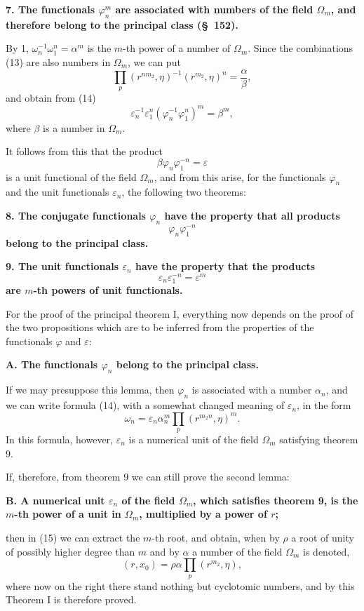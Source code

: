 \documentclass[11pt]{article}
\providecommand{\eps}{\varepsilon}
\providecommand{\eps}{\varepsilon}
\begin{document}
\textbf{7. The functionals $\varphi_n^m$ are associated with numbers of the field $\Omega_m$, and therefore belong to the principal class (\S~152).}

By 1, $\omega_n^{-1}\omega_1^n=\alpha^m$ is the $m$-th power of a number of $\Omega_m$. Since the combinations (13) are also numbers in $\Omega_m$, we can put
\[
  \prod_p (r^{n m_2},\eta)^{-1}(r^{m_2},\eta)^n=\frac{\alpha}{\beta},
\]
and obtain from (14)
\[
  \eps_n^{-1}\eps_1^n(\varphi_n^{-1}\varphi_1^n)^m=\beta^m,
\]
where $\beta$ is a number in $\Omega_m$.

It follows from this that the product
\[
  \beta\varphi_n\varphi_1^{-n}=\eps
\]
is a unit functional of the field $\Omega_m$, and from this arise, for the functionals $\varphi_n$ and the unit functionals $\eps_n$, the following two theorems:

\textbf{8. The conjugate functionals $\varphi_n$ have the property that all products}
\[
  \varphi_n\varphi_1^{-n}
\]
\textbf{belong to the principal class.}

\textbf{9. The unit functionals $\eps_n$ have the property that the products}
\[
  \eps_n\eps_1^{-n}=\eps^m
\]
\textbf{are $m$-th powers of unit functionals.}

For the proof of the principal theorem I, everything now depends on the proof of the two propositions which are to be inferred from the properties of the functionals $\varphi$ and $\eps$:

\textbf{A. The functionals $\varphi_n$ belong to the principal class.}

If we may presuppose this lemma, then $\varphi_n$ is associated with a number $\alpha_n$, and we can write formula (14), with a somewhat changed meaning of $\eps_n$, in the form
\begin{equation}
  \omega_n=\eps_n\alpha_n^m\prod_p(r^{m_2n},\eta)^m.
\tag{15}
\end{equation}
In this formula, however, $\eps_n$ is a numerical unit of the field $\Omega_m$ satisfying theorem 9.

If, therefore, from theorem 9 we can still prove the second lemma:

\textbf{B. A numerical unit $\eps_n$ of the field $\Omega_m$, which satisfies theorem 9, is the $m$-th power of a unit in $\Omega_m$, multiplied by a power of $r$;}

then in (15) we can extract the $m$-th root, and obtain, when by $\rho$ a root of unity of possibly higher degree than $m$ and by $\alpha$ a number of the field $\Omega_m$ is denoted,
\begin{equation}
  (r,x_0)=\rho\alpha\prod_p(r^{m_2},\eta),
\tag{16}
\end{equation}
where now on the right there stand nothing but cyclotomic numbers, and by this Theorem I is therefore proved.
\end{document}
